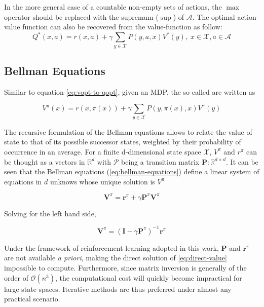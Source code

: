 In the more general case of a countable non-empty sets of actions, the $\max$
operator should be replaced with the supremum ($\sup$) of $\mathcal{A}$. The
optimal action-value function can also be recovered from the value-function as
follow:
\begin{equation}
Q^*(x,a) = r(x,a) + \gamma \sum_{y \in \mathcal{X}} P(y, a, x) V^*(y), \; x \in
\mathcal{X}, a \in \mathcal{A} \label{eq:vopt-to-qopt}
\end{equation}

\subsection{Bellman Equations}
Similar to equation \ref{eq:vopt-to-qopt}, given an MDP, the  so-called 
 are written as

\begin{equation}
V^\pi(x) = r(x, \pi(x)) + \gamma \sum_{y \in \mathcal{X}} P(y, \pi(x), x) V^\pi(y)
\label{eq:bellman-equations}
\end{equation}

The recursive formulation of the Bellman equations allows to relate the value of state
to that of its possible successor states, weighted by their probability of occurrence in
an average.  For a finite d-dimensional state space $\mathcal{X}$, $V^\pi$ and
$r^\pi$ can be thought as a vectors in $\mathbb{R}^d$ with $\mathcal{P}$ being a
transition matrix $\mathbf{P}: \mathbb{R}^{d \times d}$. It can be seen that the
Bellman equations (\ref{eq:bellman-equations}) define a linear system of equations in
$d$ unknows whose unique solution is $V^\pi$

\begin{equation}
\mathbf{V}^\pi = \mathbf{r}^\pi + \gamma \mathbf{P}^\pi \mathbf{V}^\pi
\end{equation}

Solving for the left hand side, 

\begin{equation}
\mathbf{V}^\pi = (\mathbf{I} - \gamma \mathbf{P}^\pi)^{-1} \mathbf{r}^\pi
\label{eq:direct-value}
\end{equation}

Under the framework of reinforcement learning adopted in this work,
$\mathbf{P}$ and $\mathbf{r}^\pi$ are not available \textit{a priori}, making the
direct solution of \ref{eq:direct-value} impossible to compute. Furthermore, since
matrix inversion is generally of the order of $\mathcal{O}(n^3)$, the computational
cost will quickly become impractical for large state spaces. Iterative methods are thus
preferred under almost any practical scenario. 

